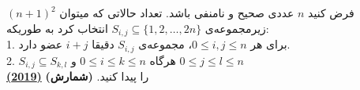 فرض کنید $n$ عددی صحیح و نامنفی باشد.
تعداد حالاتی که میتوان $(n + 1)^2$ زیرمجموعه‌ی $S_{i, j} \subseteq \{1, 2, \dots, 2n\}$ انتخاب کرد
به طوریکه: \\
1. برای هر $0 \le i, j \le n$، مجموعه‌ی $S_{i, j}$ دقیقا $i + j$ عضو دارد. \\
2. $S_{i, j} \subseteq S_{k, l}$ هرگاه $0 \le i \le k \le n$ و $0 \le j \le l \le n$ \\
را پیدا کنید.
\textbf{(شمارش)}
\href{https://artofproblemsolving.com/community/c5h1824282p12195861}{\textbf{(2019)}}